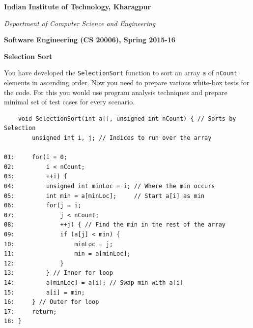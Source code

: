 \documentclass{article}
\begin{document}
\thispagestyle{plain}
\setcounter{page}{1}

\begin{center}
{\huge {\bf Indian Institute of Technology, Kharagpur}} 

{\LARGE {\em Department of Computer Science and Engineering}}
\vspace{0.4cm}

{\Large \bf Software Engineering (CS 20006), Spring 2015-16} \vspace{0.1cm}

{\large \bf Selection Sort} \vspace{0.1cm}

\end{center}

\hspace{-1cm}

\hspace{-1cm}



You have developed the \texttt{SelectionSort} function to sort an array \texttt{a} of \texttt{nCount} elements in ascending order. Now you need to prepare various white-box tests for the code. For this you would use program analysis techniques and prepare minimal set of test cases for every scenario. 

\begin{framed}
\begin{verbatim}
    void SelectionSort(int a[], unsigned int nCount) { // Sorts by Selection
        unsigned int i, j; // Indices to run over the array

01:     for(i = 0; 
02:         i < nCount; 
03:         ++i) {
04:         unsigned int minLoc = i; // Where the min occurs 
05:         int min = a[minLoc];     // Start a[i] as min 
06:         for(j = i; 
07:             j < nCount; 
08:             ++j) { // Find the min in the rest of the array
09:             if (a[j] < min) {
10:                 minLoc = j;
11:                 min = a[minLoc];
12:             }
13:         } // Inner for loop
14:         a[minLoc] = a[i]; // Swap min with a[i]
15:         a[i] = min;
16:     } // Outer for loop
17:     return;
18: }
\end{verbatim}
\end{framed}
\end{document}
